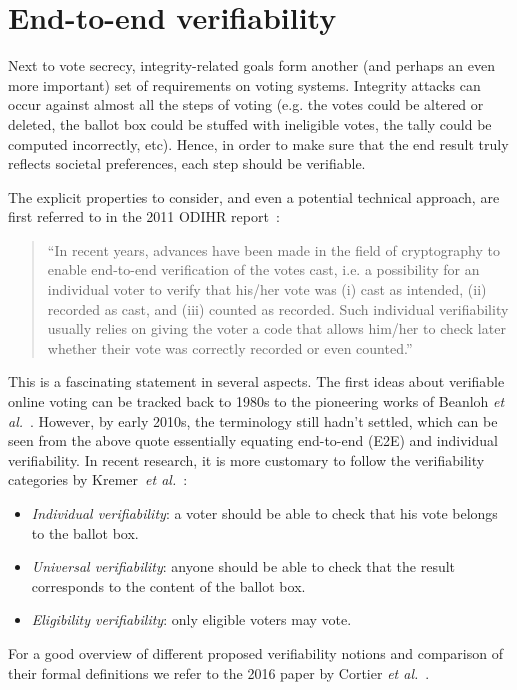 \documentclass{llncs}
\begin{document}
\section{End-to-end verifiability}

Next to vote secrecy, integrity-related goals form another (and perhaps an even more important) set of requirements on voting systems. Integrity attacks can occur against almost all the steps of voting (e.g. the votes could be altered or deleted, the ballot box could be stuffed with ineligible votes, the tally could be computed incorrectly, etc). Hence, in order to make sure that the end result truly reflects societal preferences, each step should be verifiable. 

The explicit properties to consider, and even a potential technical approach, are first referred to in the 2011 ODIHR report~\cite{ODIHR2011}:

\begin{quote}
    ``In recent years, advances have been made in the field of cryptography to enable end-to-end verification of the votes cast, i.e. a possibility for an individual voter to verify that his/her vote was (i) cast as intended, (ii) recorded as cast, and (iii) counted as recorded. Such individual verifiability usually relies on giving the voter a code that allows him/her to check later whether their vote was correctly recorded or even counted.''
\end{quote}

This is a fascinating statement in several aspects. The first ideas about verifiable online voting can be tracked back to 1980s to the pioneering works of Beanloh \emph{et al.}~\cite{DBLP:conf/focs/CohenF85,DBLP:conf/podc/BenalohY86}. However, by early 2010s, the terminology still hadn't settled, which can be seen from the above quote essentially equating end-to-end (E2E) and individual verifiability. In recent research, it is more customary to follow the verifiability categories by Kremer~\emph{et al.}~\cite{DBLP:conf/esorics/KremerRS10}:
\begin{itemize}
    \item \emph{Individual verifiability}: a voter should be able to check
    that his vote belongs to the ballot box.
    \item \emph{Universal verifiability}: anyone should be able to check
    that the result corresponds to the content of the ballot box.
    \item \emph{Eligibility verifiability}: only eligible voters may vote.
\end{itemize}
For a good overview of different proposed verifiability notions and comparison of their formal definitions we refer to the 2016 paper by Cortier \emph{et al.}~\cite{DBLP:conf/sp/CortierGKMT16}.
\end{document}
